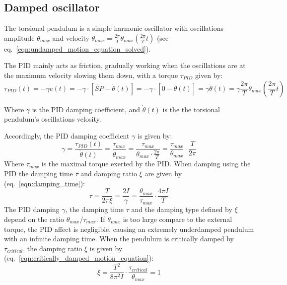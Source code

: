 \documentclass[\main/master.tex]{subfiles}
\begin{document}
\subsection{Damped oscillator}
The torsional pendulum is a simple harmonic oscillator with oscillations amplitude $\theta_{max}$ and velocity $\dot{\theta}_{max} =\frac{2\pi}{T} \theta_{max}(\frac{2\pi}{T} t)$ (see eq.~\ref{eqn:undamped_motion_equation_solved}). 
\par\noindent
The PID mainly acts as friction, gradually working when the oscillations are at the maximum velocity slowing them down, with a torque $\tau_{PID}$ given by:
\begin{equation}
\tau_{PID}(t) = -\gamma\dot{e}(t) =  -\gamma\cdot [\dot{SP} -\dot{\theta}(t)] =-\gamma\cdot [0-\dot{\theta}(t)]  =  \gamma\dot{\theta}(t) =  \gamma\frac{2\pi}{T} \theta_{max}(\frac{2\pi}{T} t) 
\label{eqn:friction_torque_pid}
\end{equation}
\par\noindent
Where $\gamma$ is the PID damping coefficient, and $\dot{\theta}(t)$ is the the torsional pendulum's oscillations velosity. 
\par\noindent
Accordingly, the PID damping coefficient $\gamma$ is given by:
\begin{equation}
\gamma  =  \frac{\tau_{PID}(t)}{\dot{\theta}(t)} = \frac{\tau_{max}}{\dot{\theta}_{max}} =  \frac{\tau_{max}}{\theta_{max}\cdot\frac{2\pi}{T}} =\frac{\tau_{max}}{\theta_{max}}\cdot \frac{ T}{2\pi}          \label{eqn:damped_pid_motion_equation_2}
\end{equation}
Where $\tau_{max}$ is the maximal torque exerted by the PID. When damping using the PID the damping time $\tau$ and damping ratio $\xi$ are given by (eq.~\ref{eqn:damping_time}):
\begin{equation}
\tau = \frac{T}{2 \pi \xi } =  \frac{2I}{\gamma} = \frac{\theta_{max}}{ \tau_{max}} \cdot \frac{4\pi I}{T}  \label{eqn:damping_time_pid}
\end{equation}
The PID damping $\gamma$, the damping time $\tau$ and the damping type defined by $\xi$ depend on the ratio $\theta_{max}/\tau_{max}$. If $\theta_{max}$ is too large compare to the external torque, the PID affect is negligible, causing an extremely underdamped pendulum with an infinite damping time. When the pendulum is critically damped  by $\tau_{critical}$, the damping ratio $\xi$ is given by (eq.~\ref{eqn:critically_damped_motion_equation}):
\begin{equation}
\xi = \frac{T^2}{ 8 \pi^2 I }\cdot\frac{ \tau_{critical}}{\theta_{max}} = 1 
\label{eqn:damping_ratio_pid}
\end{equation}
\end{document}
